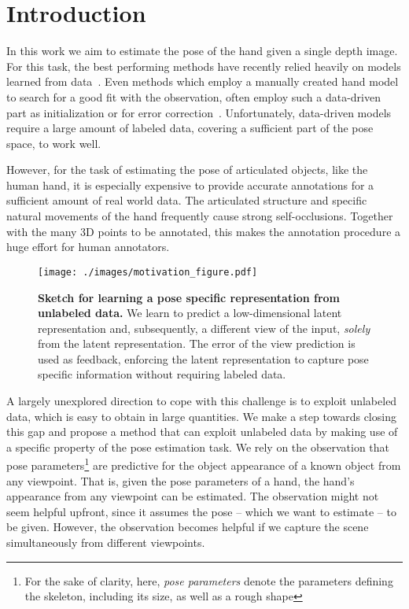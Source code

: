 \documentclass[10pt,twocolumn,letterpaper]{article}
\begin{document}
\section{Introduction}
In this work we aim to estimate the pose of the hand given a single depth image.
For this task, the best performing methods have recently relied heavily on models learned 
from data~\cite{Guo2017arxiv_goodpractices,Oberweger2015iccv_feedbackloop,
Sun2015cvpr_cascadedhaperegression,Supancic2015iccv_eval}.
Even methods which employ a manually created hand model 
to search for a good fit with the observation,
often employ such a data-driven part as initialization or 
for error correction~\cite{Krejov17cviu,Tang2015iccv_hierarchicalsampling,
Taylor2016siggraph,Ye2016eccv_attentionhybridhape}.
Unfortunately, data-driven models require a large amount of labeled data, 
covering a sufficient part of the pose space, to work well.

However, for the task of estimating the pose of articulated objects, like the human hand, 
it is especially expensive 
to provide accurate annotations for a sufficient amount of real world data.
The articulated structure and specific natural movements of the hand 
frequently cause strong self-occlusions. 
Together with the many 3D points to be annotated, 
this makes the annotation procedure a huge effort for human annotators.

\begin{figure}[t]
  \centering
  \texttt{[image: ./images/motivation\_figure.pdf]}
  \caption[]{\textbf{Sketch for learning a pose specific representation from unlabeled data.}
  We learn to predict a low-dimensional latent representation and, subsequently,
  a different view of the input, 
  \emph{solely} from the \textcolor{blue_ours}{latent representation}.
  The error of the view prediction is used as \textcolor{green_ours}{feedback},
  enforcing the latent representation to capture pose specific information
  without requiring labeled data.
  }
  \label{fig:idea_sketch}
\end{figure}

A largely unexplored direction to cope with this challenge is 
to exploit unlabeled data, which is easy to obtain in large quantities.
We make a step towards closing this gap and 
propose a method that can exploit unlabeled data
by making use of a specific property of the pose estimation task.
We rely on the observation that pose parameters\footnote{For the sake of clarity, here,
\emph{pose parameters} denote the parameters defining the skeleton, 
including its size, as well as a rough shape} 
are predictive for the object appearance of a known object from any viewpoint.
That is, given the pose parameters of a hand, the hand's appearance from any viewpoint
can be estimated.
The observation might not seem helpful upfront,
since it assumes the pose -- which we want to estimate -- to be given.
However, the observation becomes helpful if we capture the scene 
simultaneously from different viewpoints.
\end{document}
